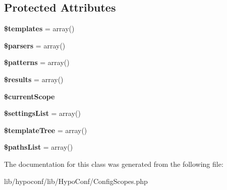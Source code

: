 \subsection*{\-Protected \-Attributes}
\begin{DoxyCompactItemize}
\item 
\hypertarget{class_hypo_conf_1_1_config_scopes_a3326a7f5703016042df69801c9770b4c}{
{\bfseries \$templates} = array()}
\label{class_hypo_conf_1_1_config_scopes_a3326a7f5703016042df69801c9770b4c}

\item 
\hypertarget{class_hypo_conf_1_1_config_scopes_ae7df9b3add8c1b302615fc85fbd27de0}{
{\bfseries \$parsers} = array()}
\label{class_hypo_conf_1_1_config_scopes_ae7df9b3add8c1b302615fc85fbd27de0}

\item 
\hypertarget{class_hypo_conf_1_1_config_scopes_a99c668c59ad650ca9b31ad5313dc5720}{
{\bfseries \$patterns} = array()}
\label{class_hypo_conf_1_1_config_scopes_a99c668c59ad650ca9b31ad5313dc5720}

\item 
\hypertarget{class_hypo_conf_1_1_config_scopes_a233d12bd8b6d3453e9a7a3f0b8c31db2}{
{\bfseries \$results} = array()}
\label{class_hypo_conf_1_1_config_scopes_a233d12bd8b6d3453e9a7a3f0b8c31db2}

\item 
\hypertarget{class_hypo_conf_1_1_config_scopes_a9c93feb36fc8b4afe71ce0b542d9c33c}{
{\bfseries \$current\-Scope}}
\label{class_hypo_conf_1_1_config_scopes_a9c93feb36fc8b4afe71ce0b542d9c33c}

\item 
\hypertarget{class_hypo_conf_1_1_config_scopes_ad5236049dbc39207ec00efd3072ba8ad}{
{\bfseries \$settings\-List} = array()}
\label{class_hypo_conf_1_1_config_scopes_ad5236049dbc39207ec00efd3072ba8ad}

\item 
\hypertarget{class_hypo_conf_1_1_config_scopes_ad412719ccc5f04df4ea317ffd5db856d}{
{\bfseries \$template\-Tree} = array()}
\label{class_hypo_conf_1_1_config_scopes_ad412719ccc5f04df4ea317ffd5db856d}

\item 
\hypertarget{class_hypo_conf_1_1_config_scopes_a18b4c76e21bc04d453bdaca84c974cde}{
{\bfseries \$paths\-List} = array()}
\label{class_hypo_conf_1_1_config_scopes_a18b4c76e21bc04d453bdaca84c974cde}

\end{DoxyCompactItemize}


\-The documentation for this class was generated from the following file\-:\begin{DoxyCompactItemize}
\item 
lib/hypoconf/lib/\-Hypo\-Conf/\-Config\-Scopes.\-php\end{DoxyCompactItemize}
